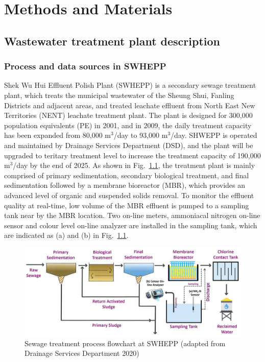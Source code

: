 \chapter{Methods and Materials}
\section{Wastewater treatment plant description}
\subsection{Process and data sources in SWHEPP}
Shek Wu Hui Effluent Polish Plant (SWHEPP) is a secondary sewage treatment plant, which treats the municipal wastewater of the Sheung Shui, Fanling Districts and adjacent areas, and treated leachate effluent from North East New Territories (NENT) leachate treatment plant. The plant is designed for 300,000 population equivalents (PE) in 2001, and in 2009, the daily treatment capacity has been expanded from 80,000 m$^3$/day to 93,000 m$^3$/day. SHWEPP is operated and maintained by Drainage Services Department (DSD), and the plant will be upgraded to teritary treatment level to increase the treatment capacity of 190,000 m$^3$/day by the end of 2025. As shown in Fig.~\ref{fig:SHWEPP-flowchart}, the treatment plant is mainly comprised of primary sedimentation, secondary biological treatment, and final sedimentation followed by a membrane bioreactor (MBR), which provides an advanced level of organic and suspended solids removal. To monitor the effluent quality at real-time, low volume of the MBR effluent is pumped to a sampling tank near by the MBR location. Two on-line meters, ammoniacal nitrogen on-line sensor and colour level on-line analyzer are installed in the sampling tank, which are indicated as (a) and (b) in Fig.~\ref{fig:SHWEPP-flowchart}.

\begin{figure}[h]
    \centering
    \includegraphics[width=0.9\columnwidth]{imgs/Sewage-treatment-process-flowchart.png}
    \caption{Sewage treatment process flowchart at SWHEPP (adapted from Drainage Services Department 2020)}
    \label{fig:SHWEPP-flowchart}
\end{figure}

